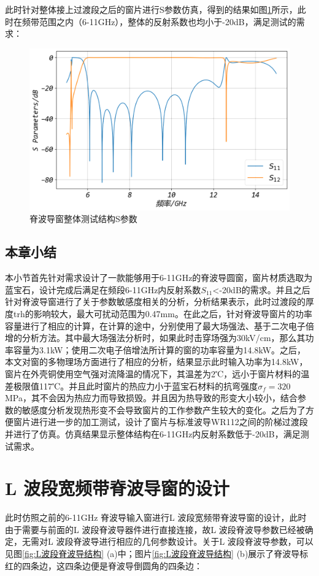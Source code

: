 \documentclass[master]{thesis-uestc}
\begin{document}
此时针对整体接上过渡段之后的窗片进行S参数仿真，得到的结果如图\ref{fig:脊波导窗整体测试结构S参数}所示，此时在频带范围之内（6-11GHz），整体的反射系数也均小于-20dB，满足测试的需求：
\begin{figure}[!htb]
    \centering
    \includegraphics[width=0.5\linewidth]{pic/chapter3/脊波导窗整体S参数.png}
    \caption{脊波导窗整体测试结构S参数}
    \label{fig:脊波导窗整体测试结构S参数}
\end{figure}

\section{本章小结}
本小节首先针对需求设计了一款能够用于6-11GHz的脊波导圆窗，窗片材质选取为蓝宝石，设计完成后满足在频段6-11GHz内反射系数\(S_{11}\)<-20dB的需求。并且之后针对脊波导窗进行了关于参数敏感度相关的分析，分析结果表示，此时过渡段的厚度trh的影响较大，最大可扰动范围为0.47mm。在此之后，针对脊波导窗片的功率容量进行了相应的计算，在计算的途中，分别使用了最大场强法、基于二次电子倍增的分析方法。其中最大场强法分析时，如果此时击穿场强为30kV/cm，那么其功率容量为3.1kW；使用二次电子倍增法所计算的窗的功率容量为14.8kW。之后，本文对窗的多物理场方面进行了相应的分析，结果显示此时输入功率为14.8kW，窗片在外壳铜使用空气强对流降温的情况下，其温差为2℃，远小于窗片材料的温差极限值117℃。并且此时窗片的热应力小于蓝宝石材料的抗弯强度\(\sigma_f = 320\)MPa，其不会因为热应力而导致损毁。并且因为热导致的形变大小较小，结合参数的敏感度分析发现热形变不会导致窗片的工作参数产生较大的变化。之后为了方便窗片进行进一步的加工测试，设计了窗片与标准波导WR112之间的阶梯过渡段并进行了仿真。仿真结果显示整体结构在6-11GHz内反射系数低于-20dB，满足测试需求。

\chapter{L 波段宽频带脊波导窗的设计}
此时仿照之前的6-11GHz 脊波导输入窗进行L 波段宽频带脊波导窗的设计，此时由于需要与前面的L 波段脊波导器件进行直接连接，故L 波段脊波导参数已经被确定，无需对L 波段脊波导进行相应的几何参数设计。关于L 波段脊波导参数，可以见图\ref{fig:L波段脊波导结构} (a)中；图片\ref{fig:L波段脊波导结构} (b)展示了脊波导标红的四条边，这四条边便是脊波导倒圆角的四条边：
\end{document}
